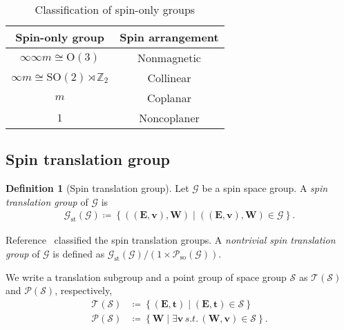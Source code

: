 \documentclass[a4paper, 11pt]{article}
\theoremstyle{definition}
\newcommand{\term}[1]{\textit{#1}}
\newcommand{\relmiddle}[1]{\mathrel{}\middle#1\mathrel{}}
\newcommand{\set}[2]{\left\{ #1 \relmiddle| #2 \right\}}
\newtheorem{definition}[theorem]{Definition}
\begin{document}
\begin{table}[tb]
  \centering
  \caption{Classification of spin-only groups}
  \label{tab:spin_only_group}
  \begin{tabular}{cc}
    \hline \hline
    Spin-only group & Spin arrangement \\
    \hline
    $\infty \infty m \cong \mathrm{O}(3)$ & Nonmagnetic \\
    $\infty m \cong \mathrm{SO}(2) \rtimes \mathbb{Z}_{2} $ & Collinear \\
    $m$ & Coplanar \\
    $1$ & Noncoplaner \\
    \hline \hline
  \end{tabular}
\end{table}

\subsection{Spin translation group}

\begin{screen}
  \begin{definition}[Spin translation group]
    Let $\mathcal{G}$ be a spin space group.
    A \term{spin translation group} of $\mathcal{G}$ is
    \begin{align}
      \mathcal{G}_{\mathrm{st}}(\mathcal{G})
      \coloneqq
      \set{ ((\bm{E}, \bm{v}), \bm{W}) }{ ((\bm{E}, \bm{v}), \bm{W}) \in \mathcal{G}}.
    \end{align}
  \end{definition}
\end{screen}

Reference~\cite{Litvin:a09793} classified the spin translation groups.
A \term{nontrivial spin translation group} of $\mathcal{G}$ is defined as $\mathcal{G}_{\mathrm{st}}(\mathcal{G}) / (1 \times \mathcal{P}_{\mathrm{so}}(\mathcal{G}))$.

We write a translation subgroup and a point group of space group $\mathcal{S}$ as $\mathcal{T}(\mathcal{S})$ and $\mathcal{P}(\mathcal{S})$, respectively,
\begin{align}
  \mathcal{T}(\mathcal{S}) &\coloneqq \set{ (\bm{E}, \bm{t}) }{ (\bm{E}, \bm{t}) \in \mathcal{S} } \\
  \mathcal{P}(\mathcal{S}) &\coloneqq \set{ \bm{W} }{ \exists \bm{v} \, s.t.\, (\bm{W}, \bm{v}) \in \mathcal{S} }.
\end{align}
\end{document}
